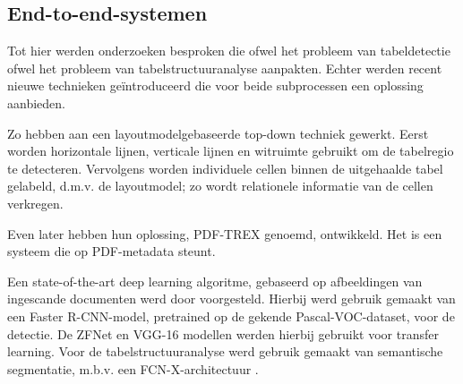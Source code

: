 \subsection{End-to-end-systemen}
\label{subssec:end-to-end-systemen}

Tot hier werden onderzoeken besproken die ofwel het probleem van tabeldetectie ofwel het probleem van tabelstructuuranalyse aanpakten. Echter werden recent nieuwe technieken geïntroduceerd die voor beide subprocessen een oplossing aanbieden.

Zo hebben \textcite{Green1996} aan een layoutmodelgebaseerde top-down techniek gewerkt. Eerst worden horizontale lijnen, verticale lijnen en witruimte gebruikt om de tabelregio te detecteren. Vervolgens worden individuele cellen binnen de uitgehaalde tabel gelabeld, d.m.v. de layoutmodel; zo wordt relationele informatie van de cellen verkregen.

Even later hebben \textcite{Oro2009} hun oplossing, PDF-TREX genoemd, ontwikkeld. Het is een systeem die op PDF-metadata steunt.

Een state-of-the-art deep learning algoritme, gebaseerd op afbeeldingen van ingescande documenten werd door \textcite{Schreiber2017} voorgesteld. Hierbij werd gebruik gemaakt van een Faster R-CNN-model, pretrained op de gekende Pascal-VOC-dataset, voor de detectie. De ZFNet \autocite{Zeiler2014} en VGG-16 \autocite{Simonyan2014} modellen werden hierbij gebruikt voor transfer learning. Voor de tabelstructuuranalyse werd gebruik gemaakt van semantische segmentatie, m.b.v. een FCN-X-architectuur \autocite{Shelhamer2017}.

